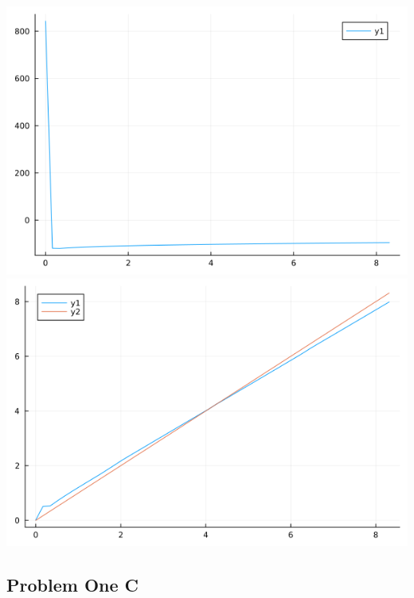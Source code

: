\documentclass{article}
\begin{document}
\includegraphics[scale = 0.5]{valueb.png}\\
\includegraphics[scale = 0.5]{capitalb.png}\\

\subsection*{Problem One C}
\end{document}
